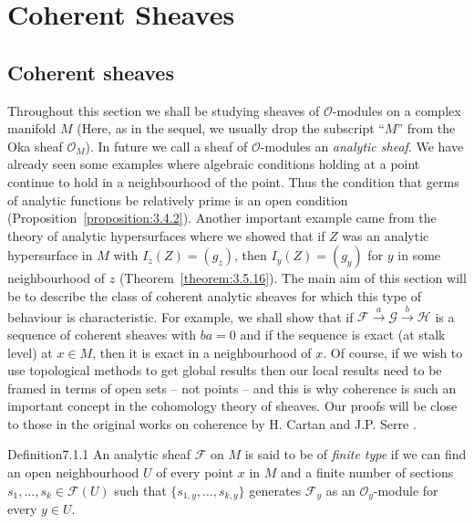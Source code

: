 \chapter{Coherent Sheaves}\label{ch:7}
\ChapterSevenIntroduction
\section{Coherent sheaves}\label{sec:7:1}
Throughout this section we shall be studying sheaves of $\mathcal{O}$-modules on a complex manifold $M$ (Here, as in the sequel, we usually drop the subscript ``$M$'' from the Oka sheaf $\mathcal{O}_M$). In future we call a sheaf of $\mathcal{O}$-modules an \emph{analytic sheaf}. We have already seen some examples where algebraic conditions holding at a point continue to hold in a neighbourhood of the point. Thus the condition that germs of analytic functions be relatively prime is an open condition (Proposition~\ref{proposition:3.4.2}). Another important example came from the theory of analytic hypersurfaces where we showed that if $Z$ was an analytic hypersurface in $M$ with $I_z(Z)=(g_z)$, then $I_y(Z)=(g_y)$ for $y$ in some neighbourhood of $z$ (Theorem~\ref{theorem:3.5.16}). The main aim of this section will be to describe the class of coherent analytic sheaves for which this type of behaviour is characteristic. For example, we shall show that if $\mathcal{F}\xrightarrow{a}\mathcal{G}\xrightarrow{b}\mathcal{H}$ is a sequence of coherent sheaves with $ba=0$ and if the sequence is exact (at stalk level) at $x\in M$, then it is exact in a neighbourhood of $x$. Of course, if we wish to use topological methods to get global results then our local results need to be framed in terms of open sets -- not points -- and this is why coherence is such an important concept in the cohomology
 theory of sheaves. Our proofs will be close to those in the original works on coherence by H. Cartan \cite{bib:II:cartan-h:1,bib:II:cartan-h:2} and J.P. Serre \cite{bib:II:serre-j-p:2}.

\begin{originaltheorem}{Definition}{7.1.1}
An analytic sheaf $\mathcal{F}$ on $M$ is said to be of \emph{finite type} if we can find an open neighbourhood $U$ of every point $x$ in $M$ and a finite number of sections $s_1,\ldots,s_k\in\mathcal{F}(U)$ such that $\{s_{1,y},\ldots,s_{k,y}\}$ generates $\mathcal{F}_y$ as an $\mathcal{O}_y$-module for every $y\in U$.
\end{originaltheorem}
